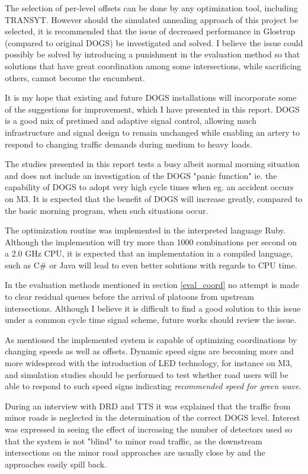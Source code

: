 The selection of per-level offsets can be done by any optimization tool, including TRANSYT. However should the simulated annealing approach of this project be selected, it is recommended that the issue of decreased performance in Glostrup (compared to original DOGS) be investigated and solved. I believe the issue could possibly be solved by introducing a punishment in the evaluation method so that solutions that have great coordination among some intersections, while sacrificing others, cannot become the encumbent.

It is my hope that existing and future DOGS installations will incorporate some of the suggestions for improvement, which I have presented in this report. DOGS is a good mix of pretimed and adaptive signal control, allowing much infrastructure and signal design to remain unchanged while enabling an artery to respond to changing traffic demands during medium to heavy loads.

The studies presented in this report tests a busy albeit normal morning situation and does not include an investigation of the DOGS "panic function" ie. the capability of DOGS to adopt very high cycle times when eg. an accident occurs on M3. It is expected that the benefit of DOGS will increase greatly, compared to the basic morning program, when such situations occur.

The optimization routine was implemented in the interpreted language Ruby. Although the implemention will try more than 1000 combinations per second on a $2.0$ GHz CPU, it is expected that an implementation in a compiled language, such as C\# or Java will lead to even better solutions with regards to CPU time.

In the evaluation methods mentioned in section \ref{eval_coord} no attempt is made to clear residual queues before the arrival of platoons from upstream intersections. Although I believe it is difficult to find a good solution to this issue under a common cycle time signal scheme, future works should review the issue.

As mentioned the implemented system is capable of optimizing coordinations by changing speeds as well as offsets. Dynamic speed signs are becoming more and more widespread with the introduction of LED technology, for instance on M3, and simulation studies should be performed to test whether road users will be able to respond to such speed signs indicating \textit{recommended speed for green wave}.

During an interview with DRD and TTS it was explained that the traffic from minor roads is neglected in the determination of the correct DOGS level. Interest was expressed in seeing the effect of increasing the number of detectors used so that the system is not "blind" to minor road traffic, as the downstream intersections on the minor road approaches are usually close by and the approaches easily spill back.


